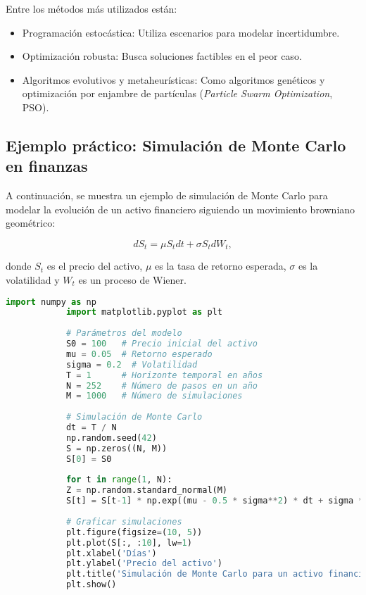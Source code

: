 \begin{itemize}
		Entre los métodos más utilizados están:
		
		\begin{itemize}
			\item Programación estocástica: Utiliza escenarios para modelar incertidumbre.
			\item Optimización robusta: Busca soluciones factibles en el peor caso.
			\item Algoritmos evolutivos y metaheurísticas: Como algoritmos genéticos y optimización por enjambre de partículas (\textit{Particle Swarm Optimization}, PSO).
		\end{itemize}
		
		\subsection{Ejemplo práctico: Simulación de Monte Carlo en finanzas}
		
		A continuación, se muestra un ejemplo de simulación de Monte Carlo para modelar la evolución de un activo financiero siguiendo un movimiento browniano geométrico:
		
		\begin{equation}
			dS_t = \mu S_t dt + \sigma S_t dW_t,
		\end{equation}
		
		donde \( S_t \) es el precio del activo, \( \mu \) es la tasa de retorno esperada, \( \sigma \) es la volatilidad y \( W_t \) es un proceso de Wiener.
		
		\begin{lstlisting}[language=Python, caption={Simulación de Monte Carlo en Python}]
			import numpy as np
			import matplotlib.pyplot as plt
			
			# Parámetros del modelo
			S0 = 100   # Precio inicial del activo
			mu = 0.05  # Retorno esperado
			sigma = 0.2  # Volatilidad
			T = 1      # Horizonte temporal en años
			N = 252    # Número de pasos en un año
			M = 1000   # Número de simulaciones
			
			# Simulación de Monte Carlo
			dt = T / N
			np.random.seed(42)
			S = np.zeros((N, M))
			S[0] = S0
			
			for t in range(1, N):
			Z = np.random.standard_normal(M)
			S[t] = S[t-1] * np.exp((mu - 0.5 * sigma**2) * dt + sigma * np.sqrt(dt) * Z)
			
			# Graficar simulaciones
			plt.figure(figsize=(10, 5))
			plt.plot(S[:, :10], lw=1)
			plt.xlabel('Días')
			plt.ylabel('Precio del activo')
			plt.title('Simulación de Monte Carlo para un activo financiero')
			plt.show()
		\end{lstlisting}
		

\end{itemize}
